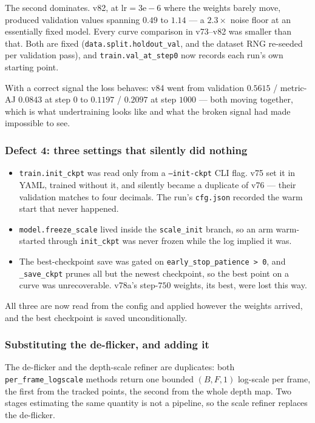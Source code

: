 \documentclass[11pt,a4paper]{article}
\begin{document}
The second dominates. v82, at $\mathrm{lr}=3\mathrm{e}{-}6$ where the weights barely move, produced
validation values spanning $0.49$ to $1.14$ --- a $2.3\times$ noise floor at an essentially fixed
model. Every curve comparison in v73--v82 was smaller than that. Both are fixed
(\texttt{data.split.holdout\_val}, and the dataset RNG re-seeded per validation pass), and
\texttt{train.val\_at\_step0} now records each run's own starting point.

With a correct signal the loss behaves: v84 went from validation $0.5615$ / metric-AJ $0.0843$ at
step $0$ to $0.1197$ / $0.2097$ at step $1000$ --- both moving together, which is what undertraining
looks like and what the broken signal had made impossible to see.

\subsubsection{Defect 4: three settings that silently did nothing}
\label{sec:dsr-noop}

\begin{itemize}
\item \texttt{train.init\_ckpt} was read only from a \texttt{--init-ckpt} CLI flag. v75 set it in
YAML, trained without it, and silently became a duplicate of v76 --- their validation matches to
four decimals. The run's \texttt{cfg.json} recorded the warm start that never happened.
\item \texttt{model.freeze\_scale} lived inside the \texttt{scale\_init} branch, so an arm
warm-started through \texttt{init\_ckpt} was never frozen while the log implied it was.
\item The best-checkpoint save was gated on \texttt{early\_stop\_patience > 0}, and
\texttt{\_save\_ckpt} prunes all but the newest checkpoint, so the best point on a curve was
unrecoverable. v78a's step-$750$ weights, its best, were lost this way.
\end{itemize}

All three are now read from the config and applied however the weights arrived, and the best
checkpoint is saved unconditionally.

\subsubsection{Substituting the de-flicker, and adding it}
\label{sec:dsr-swap}

The de-flicker and the depth-scale refiner are duplicates: both \texttt{per\_frame\_logscale}
methods return one bounded $(B,F,1)$ log-scale per frame, the first from the tracked points, the
second from the whole depth map. Two stages estimating the same quantity is not a pipeline, so the
scale refiner replaces the de-flicker.
\end{document}
